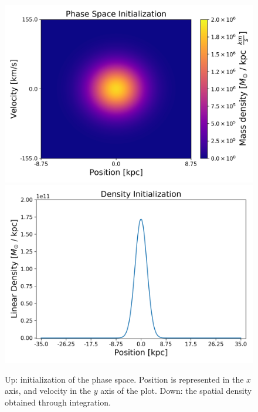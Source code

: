 \begin{figure}[h!]
    \centering
    \includegraphics[scale=0.6]{imag/1dInitPS.png}
    \includegraphics[scale=0.6]{imag/1dInitDens.png}
    \caption{Up: initialization of the phase space. Position is represented in the $x$ axis, and velocity in the $y$ axis of the plot. Down: the spatial density obtained through integration. }
    \label{1dInit}
\end{figure}
\newpage
